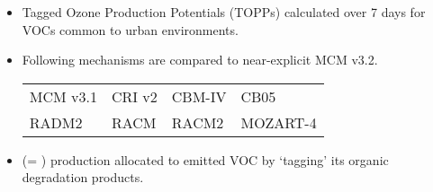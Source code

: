 \begin{BlueBox}
    \vskip-1cm
    \begin{block}{}
        \begin{itemize} 
            \item Tagged Ozone Production Potentials (TOPPs) \citep{Butler:2011} calculated over 7 days for VOCs common to urban environments. 
            \item Following mechanisms are compared to near-explicit MCM v3.2.
                {
                     \normalsize
                    \begin{table}[htp]
                        \begin{center}
                            \begin{tabular}{P{7cm}P{7cm}P{7cm}P{7cm}}
                                MCM v3.1 & CRI v2 & CBM-IV & CB05 \\
                                RADM2 & RACM & RACM2 & MOZART-4 
                            \end{tabular}
                        \end{center}
                    \end{table}
                } 
            \item {} (= ) production allocated to emitted VOC by `tagging' its organic degradation products. 
        \end{itemize}
    \end{block}
\end{BlueBox}
